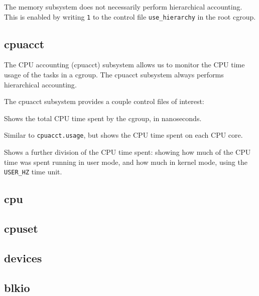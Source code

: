 The memory subsystem does not necessarily perform hierarchical accounting. This
is enabled by writing \texttt{1} to the control file \texttt{use\_hierarchy} in
the root cgroup.

\subsection{cpuacct}

The CPU accounting (cpuacct) subsystem allows us to monitor the CPU time usage
of the tasks in a cgroup. The cpuacct subsystem always performs hierarchical
accounting\cite{documentation-cgroups-cpuacct.txt}.

The cpuacct subsystem provides a couple control files of interest:

\begin{description}[\setleftmargin{0.2in}\breaklabel\setlabelstyle{\tt}]

\item[cpuacct.usage] Shows the total CPU time spent by the cgroup, in
nanoseconds.

\item[cpuacct.usage\_percpu] Similar to \texttt{cpuacct.usage}, but shows the
CPU time spent on each CPU core.

\item[cpuacct.stat] Shows a further division of the CPU time spent: showing how
much of the CPU time was spent running in user mode, and how much in kernel
mode, using the \texttt{USER\_HZ} time unit.

\end{description}

\subsection{cpu}

\subsection{cpuset}

\subsection{devices}

\subsection{blkio}
